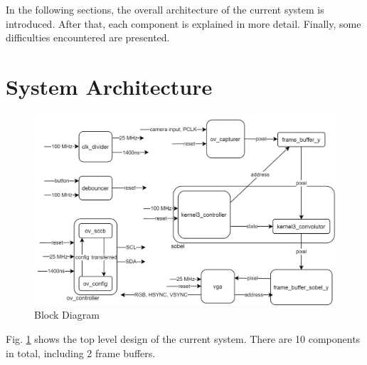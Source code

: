 \documentclass{IEEEtran}
\begin{document}
	In the following sections, the overall architecture of the current system is introduced. After that, each component is explained in more detail. Finally, some difficulties encountered are presented.
	
	\section{System Architecture}
	\begin{figure}[h]
		\centering
		\includegraphics[scale=0.27]{block}
		\caption{Block Diagram}
		\label{fig:block}
	\end{figure}
	Fig. \ref{fig:block} shows the top level design of the current system. There are 10 components in total, including 2 frame buffers.
\end{document}
